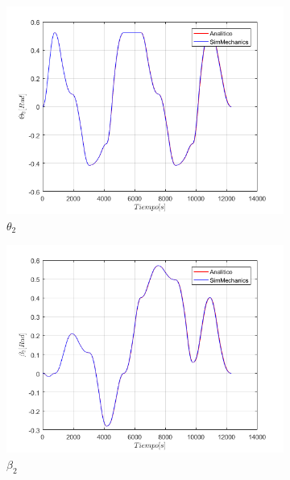\begin{figure}
\begin{subfigure}{0.45\textwidth}
        \includegraphics[width=\linewidth]{Cap4_DisenoBasico/Figura/ComparativoSimMechanics/Theta2.png}
        \caption{$\theta_2$}
    \end{subfigure}
    \begin{subfigure}{0.45\textwidth}
        \includegraphics[width=\linewidth]{Cap4_DisenoBasico/Figura/ComparativoSimMechanics/Beta2.png}
        \caption{$\beta_2$}
    \end{subfigure}
    \begin{subfigure}{0.45\textwidth}

\end{subfigure}
\end{figure}
